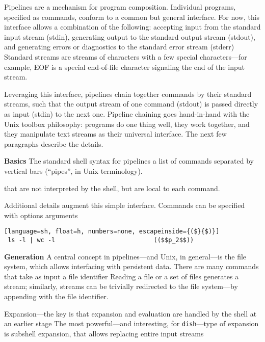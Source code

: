 \documentclass[sigplan,10pt,review,anonymous]{acmart}
\newcommand{\heading}[1]{\vspace{4pt}\noindent\textbf{#1}\enspace}
\newcommand{\ttt}[1]{\texttt{\small #1}}
\begin{document}
Pipelines are a mechanism for program composition.
Individual programs, specified as commands, conform to a common but general interface. 
For now, this interface allows a combination of the following:
  accepting input from the standard input stream (stdin),
  generating output to the standard output stream (stdout), and
  generating errors or diagnostics to the standard error stream (stderr)
Standard streams are streams of characters with a few special characters---for example, EOF is a special end-of-file character signaling the end of the input stream.

Leveraging this interface, pipelines chain together commands by their standard streams, such that the output stream of one command (stdout) is passed directly as input (stdin) to the next one.
Pipeline chaining goes hand-in-hand with the Unix toolbox philosophy: 
  programs do one thing well, they work together, and they manipulate text streams as their universal interface.
The next few paragraphs describe the details.

\heading{Basics}
The standard shell syntax for pipelines a list of commands separated by vertical bars (``pipes'', in Unix terminology).

that are not interpreted by the shell, but are local to each command.

Additional details augment this simple interface.
Commands can be specified with options arguments


\begin{lstlisting}[language=sh, float=h, numbers=none, escapeinside={($}{$)}]
 ls -l | wc -l                           (($$p_2$$))
\end{lstlisting}

\heading{Generation}
A central concept in pipelines---and Unix, in general---is the file system, which allows interfacing with persistent data.
There are many commands that take as input a file identifier 
Reading a file or a set of files generates a stream; 
  similarly, streams can be trivially redirected to the file system---by appending with the file identifier.

Expansion---the key is that expansion and evaluation are handled by the shell at an earlier stage 
The most powerful---and interesting, for \ttt{dish}---type of expansion is subshell expansion, that allows replacing entire input streams 
\end{document}
